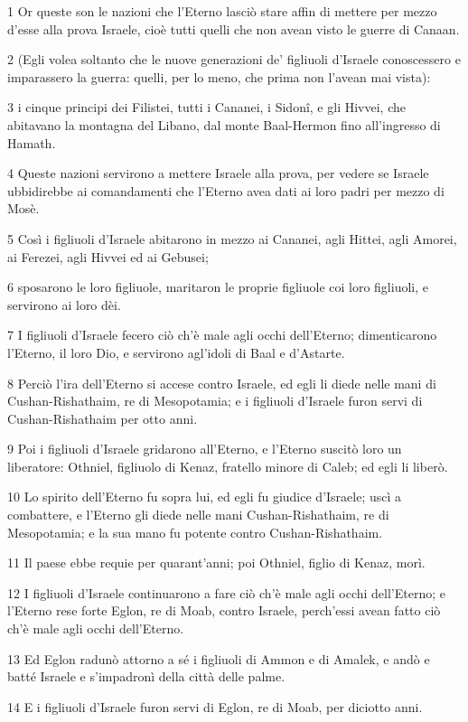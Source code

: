 \par 1 Or queste son le nazioni che l'Eterno lasciò stare affin di mettere per mezzo d'esse alla prova Israele, cioè tutti quelli che non avean visto le guerre di Canaan.
\par 2 (Egli volea soltanto che le nuove generazioni de' figliuoli d'Israele conoscessero e imparassero la guerra: quelli, per lo meno, che prima non l'avean mai vista):
\par 3 i cinque principi dei Filistei, tutti i Cananei, i Sidonî, e gli Hivvei, che abitavano la montagna del Libano, dal monte Baal-Hermon fino all'ingresso di Hamath.
\par 4 Queste nazioni servirono a mettere Israele alla prova, per vedere se Israele ubbidirebbe ai comandamenti che l'Eterno avea dati ai loro padri per mezzo di Mosè.
\par 5 Così i figliuoli d'Israele abitarono in mezzo ai Cananei, agli Hittei, agli Amorei, ai Ferezei, agli Hivvei ed ai Gebusei;
\par 6 sposarono le loro figliuole, maritaron le proprie figliuole coi loro figliuoli, e servirono ai loro dèi.
\par 7 I figliuoli d'Israele fecero ciò ch'è male agli occhi dell'Eterno; dimenticarono l'Eterno, il loro Dio, e servirono agl'idoli di Baal e d'Astarte.
\par 8 Perciò l'ira dell'Eterno si accese contro Israele, ed egli li diede nelle mani di Cushan-Rishathaim, re di Mesopotamia; e i figliuoli d'Israele furon servi di Cushan-Rishathaim per otto anni.
\par 9 Poi i figliuoli d'Israele gridarono all'Eterno, e l'Eterno suscitò loro un liberatore: Othniel, figliuolo di Kenaz, fratello minore di Caleb; ed egli li liberò.
\par 10 Lo spirito dell'Eterno fu sopra lui, ed egli fu giudice d'Israele; uscì a combattere, e l'Eterno gli diede nelle mani Cushan-Rishathaim, re di Mesopotamia; e la sua mano fu potente contro Cushan-Rishathaim.
\par 11 Il paese ebbe requie per quarant'anni; poi Othniel, figlio di Kenaz, morì.
\par 12 I figliuoli d'Israele continuarono a fare ciò ch'è male agli occhi dell'Eterno; e l'Eterno rese forte Eglon, re di Moab, contro Israele, perch'essi avean fatto ciò ch'è male agli occhi dell'Eterno.
\par 13 Ed Eglon radunò attorno a sé i figliuoli di Ammon e di Amalek, e andò e batté Israele e s'impadronì della città delle palme.
\par 14 E i figliuoli d'Israele furon servi di Eglon, re di Moab, per diciotto anni.
